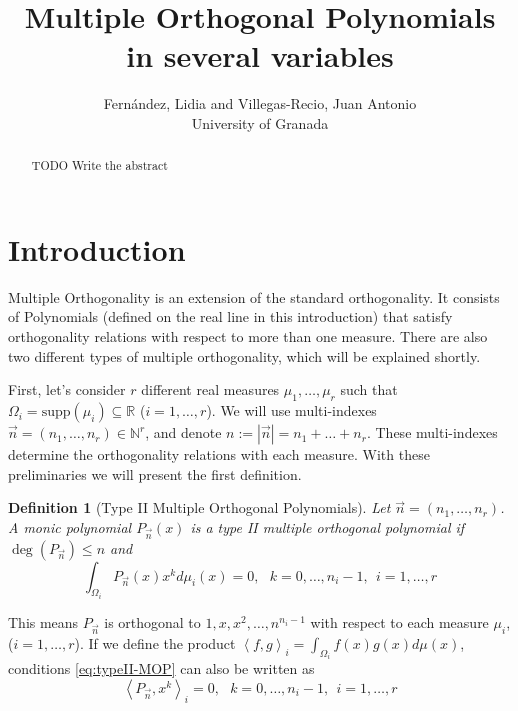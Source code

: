 \documentclass[12pt,a4]{article}
\theoremstyle{plain}
\newtheorem{definition}[theorem]{Definition}
\newcommand{\R}[0]{\mathbb{R}}
\newcommand{\N}[0]{\mathbb{N}}
\newcommand{\supp}[0]{\mathrm{supp}}
\newcommand{\cred}[1]{{\color{red} #1}}
\newcommand{\prodesc}[2]{\left\langle #1 , #2 \right\rangle}
\begin{document}
\title{Multiple Orthogonal Polynomials in several variables}


\author{Fernández, Lidia and Villegas-Recio, Juan Antonio\\
\small University of Granada}
\maketitle

\begin{abstract}
\cred{TODO Write the abstract}
\end{abstract}

\section{Introduction}

Multiple Orthogonality is an extension of the standard orthogonality. It consists of Polynomials (defined on the real line in this introduction) that satisfy orthogonality relations with respect to more than one measure. There are also two different types of multiple orthogonality, which will be explained shortly.

First, let's consider $r$ different real measures $\mu_1,\dots,\mu_r$ such that $\Omega_i=\supp(\mu_i)\subseteq\R$ ($i=1,\dots,r$). We will use multi-indexes $\vec n = (n_1, \dots,n_r)\in \N^r$, and denote $n:=|\vec n| = n_1 + \dots + n_r$. These multi-indexes determine the orthogonality relations with each measure. With these preliminaries we will present the first definition.

\begin{definition}[Type II Multiple Orthogonal Polynomials]
    Let $\vec n = (n_1,\dots,n_r)$. A monic polynomial $P_{\vec n}(x)$ is a type II multiple orthogonal polynomial if $\deg(P_{\vec n})\leq n$ and 
    \begin{equation}
        \label{eq:typeII-MOP}
        \int_{\Omega_i} P_{\vec n}(x) x^k d\mu_i(x) = 0, \ \ \ k=0,\dots,n_{i}-1, \ \ i = 1,\dots,r
    \end{equation}
\end{definition}

This means $P_{\vec n}$ is orthogonal to $1,x,x^2,\dots,n^{n_i-1}$ with respect to each measure $\mu_i$, ($i=1,\dots,r$). If we define the product $\prodesc{f}{g}_i=\int_{\Omega_i}f(x)g(x)d\mu(x)$, conditions \eqref{eq:typeII-MOP} can also be written as
\begin{equation}
    \label{eq:typeII-MOP-dot}
    \prodesc{P_{\vec n}}{x^k}_i = 0, \ \ \ k=0,\dots,n_{i}-1, \ \ i = 1,\dots,r
\end{equation}
\end{document}
